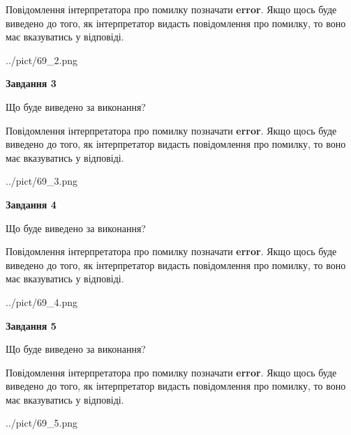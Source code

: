 \documentclass[12pt, ukrainian]{article}
\begin{document}
{\begin {large}
Повідомлення інтерпретатора про помилку позначати \textbf{error}.
Якщо щось буде виведено до того, як інтерпретатор видасть повідомлення про помилку, 
то воно має вказуватись у відповіді. \par


\begin{center}
	{../pict/69_2.png}
\end{center}
\newpage

{\begin {center}\textbf{Завдання 3}\end {center}}\par
Що буде виведено за виконання?

Повідомлення інтерпретатора про помилку позначати \textbf{error}.
Якщо щось буде виведено до того, як інтерпретатор видасть повідомлення про помилку, 
то воно має вказуватись у відповіді. \par


\begin{center}
	{../pict/69_3.png}
\end{center}
\newpage

{\begin {center}\textbf{Завдання 4}\end {center}}\par
Що буде виведено за виконання?

Повідомлення інтерпретатора про помилку позначати \textbf{error}.
Якщо щось буде виведено до того, як інтерпретатор видасть повідомлення про помилку, 
то воно має вказуватись у відповіді. \par


\begin{center}
	{../pict/69_4.png}
\end{center}
\newpage

{\begin {center}\textbf{Завдання 5}\end {center}}\par
Що буде виведено за виконання?

Повідомлення інтерпретатора про помилку позначати \textbf{error}.
Якщо щось буде виведено до того, як інтерпретатор видасть повідомлення про помилку, 
то воно має вказуватись у відповіді. \par


\begin{center}
	{../pict/69_5.png}
\end{center}
\newpage


\end{large}}
\end{document}
